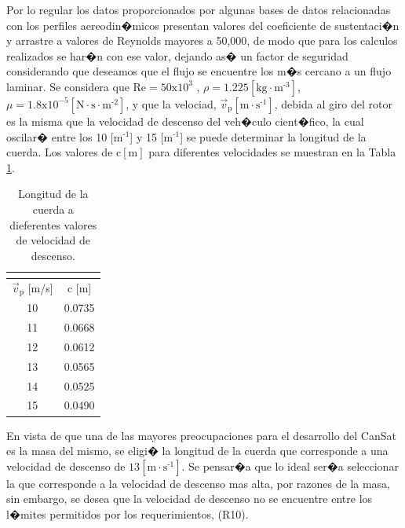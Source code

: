 \documentclass[10pt,a4paper]{book}
\begin{document}
Por lo regular los datos proporcionados por algunas bases de datos relacionadas con los perfiles aereodin�micos presentan valores del coeficiente de sustentaci�n y arrastre a valores de Reynolds mayores a 50,000, de modo que para los calculos realizados se har�n con ese valor, dejando as� un factor de seguridad considerando que deseamos que el flujo se encuentre los m�s cercano a un flujo laminar. Se considera que $\text{Re} = 50\text{x}10^{3}$ , $\rho = \text{1{.}225} [\text{kg} \cdot \text{m}^{\text{-3}}]$,
 $ \mu = 1{.}8 \text{x} 10^{-5} [\text{N} \cdot \text{s} \cdot \text{m}^{\text{-2}}]$, y que la velociad, $\overrightarrow{v}_{\text{p}} [\text{m} \cdot \text{s}^{\text{-1}}]$, debida al giro del rotor es la misma que la velocidad de descenso  del veh�culo cient�fico, la cual oscilar� entre los 10 [$\text{m}^{\text{-1}}$] y 15 [$\text{m}^{\text{-1}}$] se puede determinar la longitud de la cuerda. Los valores de $\text{c}[\text{m}]$ para diferentes velocidades se muestran en la Tabla \ref{valoresc}.
\begin{table}[H]
\begin{center}
\caption{Longitud de la cuerda a dieferentes valores de velocidad de descenso.}
\label{valoresc}
\resizebox{3cm}{!} {
\begin{tabular}{m{2cm}p{3cm}}
\multicolumn{2}{c}{}\tabularnewline
\toprule
\multicolumn{1}{c}{$\overrightarrow{v}_{\text{p}}$ [m/s]} & \multicolumn{1}{c}{c [m]}\tabularnewline
\multicolumn{1}{c}{10} & \multicolumn{1}{c}{0.0735}\tabularnewline
\multicolumn{1}{c}{11} & \multicolumn{1}{c}{0.0668}\tabularnewline
\multicolumn{1}{c}{12} & \multicolumn{1}{c}{0.0612}\tabularnewline
\multicolumn{1}{c}{13} & \multicolumn{1}{c}{0.0565}\tabularnewline
\multicolumn{1}{c}{14} & \multicolumn{1}{c}{0.0525}\tabularnewline
\multicolumn{1}{c}{15} & \multicolumn{1}{c}{0.0490}\tabularnewline
\bottomrule
\end{tabular}
}
\end{center}
\end{table}

En vista de que una de las mayores preocupaciones para el desarrollo del CanSat es la masa del mismo, se eligi� la longitud de la cuerda que corresponde a una velocidad de descenso de $13 [\text{m} \cdot \text{s}^{\text{-1}}]$. Se pensar�a que lo ideal ser�a seleccionar la que corresponde a la velocidad de descenso mas alta, por razones de la masa, sin embargo, se desea que la velocidad de descenso no se encuentre entre los l�mites permitidos por los requerimientos, (R10).\\
\end{document}
